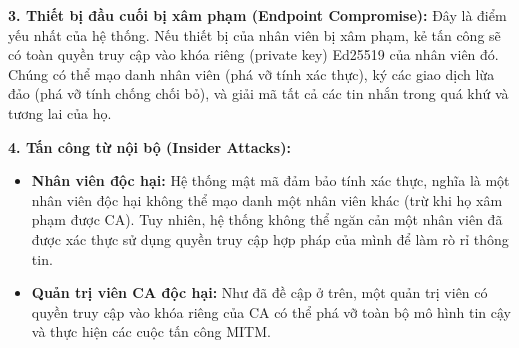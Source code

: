 \textbf{3. Thiết bị đầu cuối bị xâm phạm (Endpoint Compromise):} Đây là điểm yếu nhất của hệ thống. Nếu thiết bị của nhân viên bị xâm phạm, kẻ tấn công sẽ có toàn quyền truy cập vào khóa riêng (private key) Ed25519 của nhân viên đó. Chúng có thể mạo danh nhân viên (phá vỡ tính xác thực), ký các giao dịch lừa đảo (phá vỡ tính chống chối bỏ), và giải mã tất cả các tin nhắn trong quá khứ và tương lai của họ.

\textbf{4. Tấn công từ nội bộ (Insider Attacks):}

\begin{itemize}
    \item \textbf{Nhân viên độc hại:} Hệ thống mật mã đảm bảo tính xác thực, nghĩa là một nhân viên độc hại không thể mạo danh một nhân viên khác (trừ khi họ xâm phạm được CA). Tuy nhiên, hệ thống không thể ngăn cản một nhân viên đã được xác thực sử dụng quyền truy cập hợp pháp của mình để làm rò rỉ thông tin.
    
    \item \textbf{Quản trị viên CA độc hại:} Như đã đề cập ở trên, một quản trị viên có quyền truy cập vào khóa riêng của CA có thể phá vỡ toàn bộ mô hình tin cậy và thực hiện các cuộc tấn công MITM.
\end{itemize}
